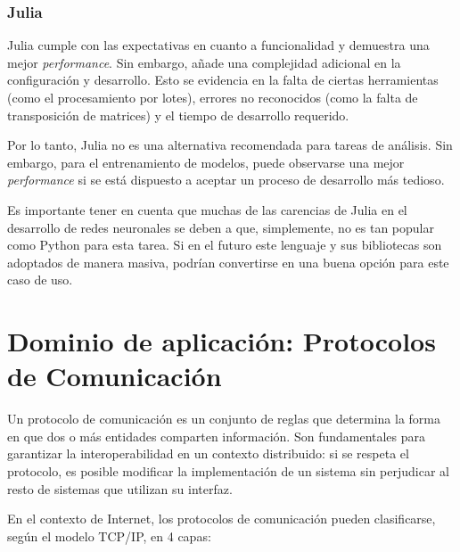 \documentclass[11pt]{article}
\let\Oldsection\section
\renewcommand{\section}{\FloatBarrier\Oldsection}
\let\Oldsubsubsection\subsubsection
\renewcommand{\subsubsection}{\FloatBarrier\Oldsubsubsection}
\newcommand{\english}[1]{\textit{#1}}
\begin{document}
\subsubsection{Julia}

Julia cumple con las expectativas en cuanto a funcionalidad y demuestra una mejor \english{performance}. Sin embargo, añade una complejidad adicional en la configuración y desarrollo. Esto se evidencia en la falta de ciertas herramientas (como el procesamiento por lotes), errores no reconocidos (como la falta de transposición de matrices) y el tiempo de desarrollo requerido.

Por lo tanto, Julia no es una alternativa recomendada para tareas de análisis. Sin embargo, para el entrenamiento de modelos, puede observarse una mejor \english{performance} si se está dispuesto a aceptar un proceso de desarrollo más tedioso.

Es importante tener en cuenta que muchas de las carencias de Julia en el desarrollo de redes neuronales se deben a que, simplemente, no es tan popular como Python para esta tarea. Si en el futuro este lenguaje y sus bibliotecas son adoptados de manera masiva, podrían convertirse en una buena opción para este caso de uso.

\newpage

\section{Dominio de aplicación: Protocolos de Comunicación}

Un protocolo de comunicación es un conjunto de reglas que determina la forma en que dos o más entidades comparten información. Son fundamentales para garantizar la interoperabilidad en un contexto distribuido: si se respeta el protocolo, es posible modificar la implementación de un sistema sin perjudicar al resto de sistemas que utilizan su interfaz.

En el contexto de Internet, los protocolos de comunicación pueden clasificarse, según el modelo TCP/IP, en 4 capas:
\end{document}
